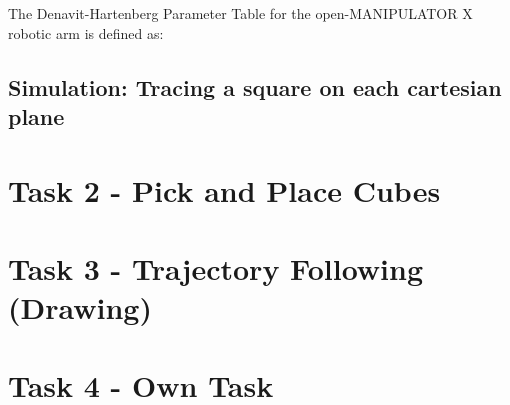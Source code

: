 \documentclass[10pt, a4paper]{article}
\begin{document}
The Denavit-Hartenberg Parameter Table for the open-MANIPULATOR X robotic arm is
defined as:


\subsection{Simulation: Tracing a square on each cartesian plane}

\section{Task 2 - Pick and Place Cubes}




\section{Task 3 - Trajectory Following (Drawing)}




\section{Task 4 - Own Task}
\end{document}
